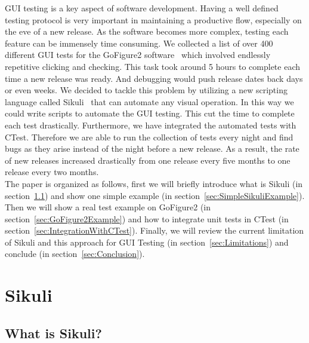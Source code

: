\documentclass{InsightArticle}
\begin{document}
GUI testing is a key aspect of software development. Having a well defined
testing protocol is very important in maintaining a productive flow, especially
on the eve of a new release. As the software becomes more complex, testing each
feature can be immensely time consuming. We collected a list of over 400
different GUI tests for the GoFigure2 software~\cite{GoFigure2:Website} which
involved endlessly repetitive clicking and checking. This task took around 5
hours to complete each time a new release was ready. And debugging would push
release dates back days or even weeks. We decided to tackle this problem by
utilizing a new scripting language called
Sikuli~\cite{Sikuli:Documentation,Sikuli:Website,Yeh:2009:Sikuli} that can
automate any visual operation. In this way we could write scripts to automate
the GUI testing. This cut the time to complete each test drastically.
Furthermore, we have integrated the automated tests with CTest. Therefore we
are able to run the collection of tests every night and find bugs as they
arise instead of the night before a new release. As a result, the rate of new
releases increased drastically from one
release every five months to one release every two months. \\

The paper is organized as follows, first we will briefly introduce what is
Sikuli (in section~\ref{sec:WhatIsSikuli}) and show one simple example (in
section~\ref{sec:SimpleSikuliExample}). Then we will show a real test example
on GoFigure2 (in section~\ref{sec:GoFigure2Example}) and how to integrate
unit tests in CTest (in section~\ref{sec:IntegrationWithCTest}). Finally, we
will review the current limitation of Sikuli and this approach for GUI Testing
(in section~\ref{sec:Limitations}) and conclude (in
section~\ref{sec:Conclusion}).


\section{Sikuli}

\subsection{What is Sikuli?}
\label{sec:WhatIsSikuli}
\end{document}
